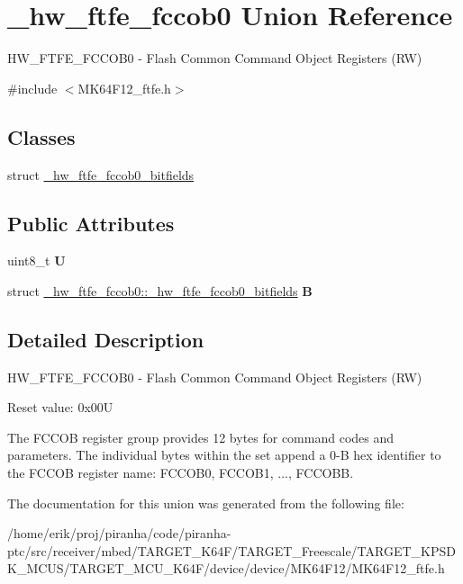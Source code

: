 \hypertarget{union__hw__ftfe__fccob0}{}\section{\+\_\+hw\+\_\+ftfe\+\_\+fccob0 Union Reference}
\label{union__hw__ftfe__fccob0}


H\+W\+\_\+\+F\+T\+F\+E\+\_\+\+F\+C\+C\+O\+B0 -\/ Flash Common Command Object Registers (RW)  




{\ttfamily \#include $<$M\+K64\+F12\+\_\+ftfe.\+h$>$}

\subsection*{Classes}
\begin{DoxyCompactItemize}
\item 
struct \hyperlink{struct__hw__ftfe__fccob0_1_1__hw__ftfe__fccob0__bitfields}{\+\_\+hw\+\_\+ftfe\+\_\+fccob0\+\_\+bitfields}
\end{DoxyCompactItemize}
\subsection*{Public Attributes}
\begin{DoxyCompactItemize}
\item 
uint8\+\_\+t {\bfseries U}\hypertarget{union__hw__ftfe__fccob0_a552f37563bf01e1b3cb8103f2d14bfa5}{}\label{union__hw__ftfe__fccob0_a552f37563bf01e1b3cb8103f2d14bfa5}

\item 
struct \hyperlink{struct__hw__ftfe__fccob0_1_1__hw__ftfe__fccob0__bitfields}{\+\_\+hw\+\_\+ftfe\+\_\+fccob0\+::\+\_\+hw\+\_\+ftfe\+\_\+fccob0\+\_\+bitfields} {\bfseries B}\hypertarget{union__hw__ftfe__fccob0_a3ea5cee2a4b9579ae9864be33981d43b}{}\label{union__hw__ftfe__fccob0_a3ea5cee2a4b9579ae9864be33981d43b}

\end{DoxyCompactItemize}


\subsection{Detailed Description}
H\+W\+\_\+\+F\+T\+F\+E\+\_\+\+F\+C\+C\+O\+B0 -\/ Flash Common Command Object Registers (RW) 

Reset value\+: 0x00U

The F\+C\+C\+OB register group provides 12 bytes for command codes and parameters. The individual bytes within the set append a 0-\/B hex identifier to the F\+C\+C\+OB register name\+: F\+C\+C\+O\+B0, F\+C\+C\+O\+B1, ..., F\+C\+C\+O\+BB. 

The documentation for this union was generated from the following file\+:\begin{DoxyCompactItemize}
\item 
/home/erik/proj/piranha/code/piranha-\/ptc/src/receiver/mbed/\+T\+A\+R\+G\+E\+T\+\_\+\+K64\+F/\+T\+A\+R\+G\+E\+T\+\_\+\+Freescale/\+T\+A\+R\+G\+E\+T\+\_\+\+K\+P\+S\+D\+K\+\_\+\+M\+C\+U\+S/\+T\+A\+R\+G\+E\+T\+\_\+\+M\+C\+U\+\_\+\+K64\+F/device/device/\+M\+K64\+F12/M\+K64\+F12\+\_\+ftfe.\+h\end{DoxyCompactItemize}
